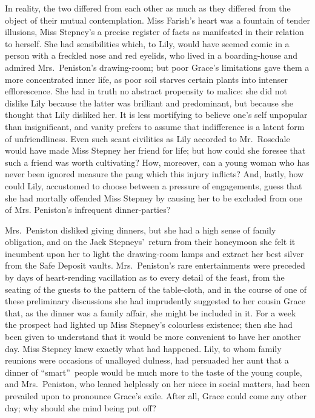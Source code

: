 \documentclass[12pt,a4paper]{book}
\begin{document}
In reality, the two differed from each other as much as they
differed from the object of their mutual contemplation. Miss
Farish's heart was a fountain of tender illusions, Miss Stepney's
a precise register of facts as manifested in their relation to
herself. She had sensibilities which, to Lily, would have seemed
comic in a person with a freckled nose and red eyelids, who lived
in a boarding-house and admired Mrs.\ Peniston's drawing-room; but
poor Grace's limitations gave them a more concentrated inner
life, as poor soil starves certain plants into intenser
efflorescence. She had in truth no abstract propensity to malice: 
she did not dislike Lily because the latter was brilliant and
predominant, but because she thought that Lily disliked her. It
is less mortifying to believe one's self unpopular than
insignificant, and vanity prefers to assume that indifference is
a latent form of unfriendliness. Even such scant civilities as
Lily accorded to Mr.\ Rosedale would have made Miss Stepney her
friend for life; but how could she foresee that such a friend was
worth cultivating? How, moreover, can a young woman who has never
been ignored measure the pang which this injury inflicts? And,
lastly, how could Lily, accustomed to choose between a
pressure of engagements, guess that she had mortally offended
Miss Stepney by causing her to be excluded from one of Mrs.
Peniston's infrequent dinner-parties?





Mrs.\ Peniston disliked giving dinners, but she had a high sense
of family obligation, and on the Jack Stepneys'\ return from their
honeymoon she felt it incumbent upon her to light the
drawing-room lamps and extract her best silver from the Safe
Deposit vaults. Mrs.\ Peniston's rare entertainments were preceded
by days of heart-rending vacillation as to every detail of the
feast, from the seating of the guests to the pattern of the
table-cloth, and in the course of one of these preliminary
discussions she had imprudently suggested to her cousin Grace
that, as the dinner was a family affair, she might be included in
it. For a week the prospect had lighted up Miss Stepney's
colourless existence; then she had been given to understand that
it would be more convenient to have her another day. Miss Stepney
knew exactly what had happened. Lily, to whom family reunions
were occasions of unalloyed dulness, had persuaded her aunt that
a dinner of ``smart''\ people would be much more to the taste of the
young couple, and Mrs.\ Peniston, who leaned helplessly on her
niece in social matters, had been prevailed upon to pronounce
Grace's exile. After all, Grace could come any other day; why
should she mind being put off?
\end{document}
